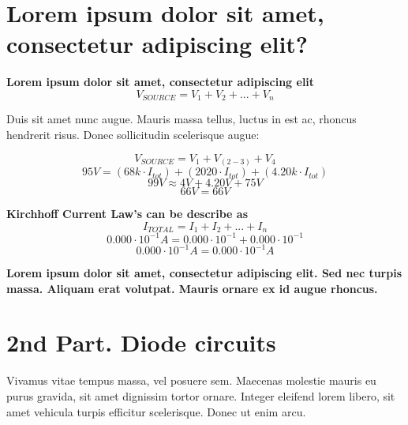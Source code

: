 \documentclass[article]{IEEEtran}
\begin{document}
\section*{Lorem ipsum dolor sit amet, consectetur adipiscing elit?}

\textbf{Lorem ipsum dolor sit amet, consectetur adipiscing elit}
\begin{equation}
    V_{SOURCE} = V_1 + V_2 + ... + V_n
\end{equation}

 Duis sit amet nunc augue. Mauris massa tellus, luctus in est ac, rhoncus hendrerit risus. Donec sollicitudin scelerisque augue:

\begin{equation}
    V_{SOURCE} = V_1 + V_{(2-3)} + V_4
\end{equation}
\begin{equation}
        95V = (68k \cdot I_{tot}) + (2020 \cdot I_{tot}) + (4.20k \cdot I_{tot}) 
\end{equation}
\begin{equation}
    99V \approx 4V + 4.20V + 75V 
\end{equation}
\begin{equation}
    66V = 66V
\end{equation}

\textbf{Kirchhoff Current Law's can be describe as}
\begin{equation}
    I_{TOTAL} = I_1 + I_2 + ... + I_n
\end{equation}
\begin{equation}
    0.000 \cdot 10^{-1} A = 0.000 \cdot 10^{-1} + 0.000  \cdot 10^{-1}
\end{equation}
\begin{equation}
    0.000 \cdot 10^{-1} A = 0.000 \cdot 10^{-1} A
\end{equation}

\textbf{Lorem ipsum dolor sit amet, consectetur adipiscing elit. Sed nec turpis massa. Aliquam erat volutpat. Mauris ornare ex id augue rhoncus.}

\section{2nd Part. Diode circuits}

Vivamus vitae tempus massa, vel posuere sem. Maecenas molestie mauris eu purus gravida, sit amet dignissim tortor ornare. Integer eleifend lorem libero, sit amet vehicula turpis efficitur scelerisque. Donec ut enim arcu. 
\end{document}
